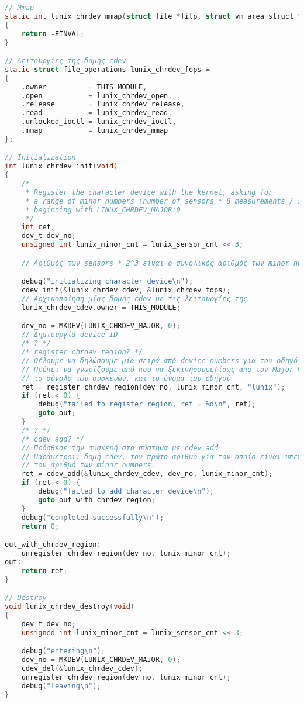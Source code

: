 \documentclass{article}
\begin{document}
\begin{lstlisting}[language=C,basicstyle=\tiny]
// Mmap 
static int lunix_chrdev_mmap(struct file *filp, struct vm_area_struct *vma)
{
	return -EINVAL;
}

// Λειτουργίες της δομής cdev 
static struct file_operations lunix_chrdev_fops = 
{
	.owner          = THIS_MODULE,
	.open           = lunix_chrdev_open,
	.release        = lunix_chrdev_release,
	.read           = lunix_chrdev_read,
	.unlocked_ioctl = lunix_chrdev_ioctl,
	.mmap           = lunix_chrdev_mmap
};

// Initialization
int lunix_chrdev_init(void)
{
	/*
	 * Register the character device with the kernel, asking for
	 * a range of minor numbers (number of sensors * 8 measurements / sensor)
	 * beginning with LINUX_CHRDEV_MAJOR:0
	 */
	int ret;
	dev_t dev_no;
	unsigned int lunix_minor_cnt = lunix_sensor_cnt << 3;

	// Αριθμός των sensors * 2^3 είναι ο συνολικός αριθμός των minor numbers

	debug("initializing character device\n");
	cdev_init(&lunix_chrdev_cdev, &lunix_chrdev_fops);
	// Αρχικοποίηση μίας δομής cdev με τις λειτουργίες της
	lunix_chrdev_cdev.owner = THIS_MODULE;

	dev_no = MKDEV(LUNIX_CHRDEV_MAJOR, 0);
	// Δημιουργία device ID 
	/* ? */
	/* register_chrdev_region? */
	// Θέλουμε να δηλώσουμε μία σειρά από device numbers για τον οδηγό
	// Πρέπει να γνωρίζουμε από που να ξεκινήσουμε(ίσως απο τον Major Number),
	// το σύνολο των συσκευών, και το όνομα του οδηγού 
	ret = register_chrdev_region(dev_no, lunix_minor_cnt, "lunix");
	if (ret < 0) {
		debug("failed to register region, ret = %d\n", ret);
		goto out;
	}	
	/* ? */
	/* cdev_add? */
	// Πρόσθεσε την συσκευή στο σύστημα με cdev_add
	// Παράμετροι: δομή cdev, τον πρώτο αριθμό για τον οποίο είναι υπεύθυνη η συσκευή
	// τον αριθμό των minor numbers.
	ret = cdev_add(&lunix_chrdev_cdev, dev_no, lunix_minor_cnt);
	if (ret < 0) {
		debug("failed to add character device\n");
		goto out_with_chrdev_region;
	}
	debug("completed successfully\n");
	return 0;

out_with_chrdev_region:
	unregister_chrdev_region(dev_no, lunix_minor_cnt);
out:
	return ret;
}

// Destroy
void lunix_chrdev_destroy(void)
{
	dev_t dev_no;
	unsigned int lunix_minor_cnt = lunix_sensor_cnt << 3;

	debug("entering\n");
	dev_no = MKDEV(LUNIX_CHRDEV_MAJOR, 0);
	cdev_del(&lunix_chrdev_cdev);
	unregister_chrdev_region(dev_no, lunix_minor_cnt);
	debug("leaving\n");
}
\end{lstlisting}
\end{document}
